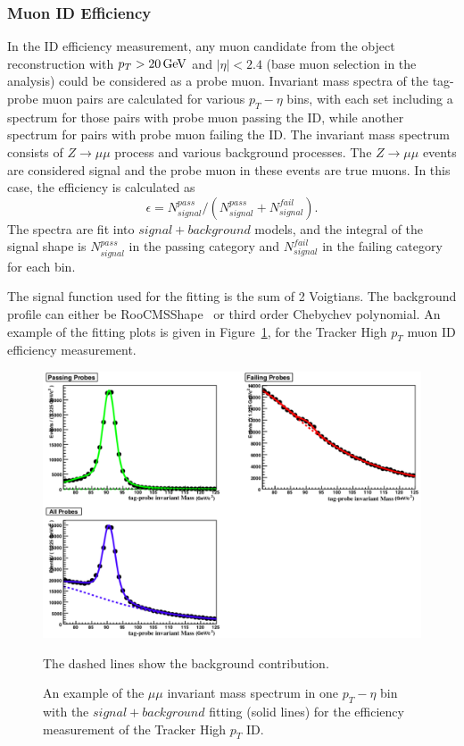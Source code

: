 \subsubsection{Muon ID Efficiency}
In the ID efficiency measurement, any muon candidate from the object reconstruction with $p_T > 20\,\text{Ge\hspace{-.08em}V}$ and $|\eta|<2.4$ (base muon selection in the analysis) could be considered as a probe muon. Invariant mass spectra of the tag-probe muon pairs are calculated for various $p_T - \eta$ bins, with each set including a spectrum for those pairs with probe muon passing the ID, while another spectrum for pairs with probe muon failing the ID. The invariant mass spectrum consists of $Z\rightarrow \mu\mu$ process and various background processes. The $Z\rightarrow \mu\mu$ events are considered signal and the probe muon in these events are true muons. In this case, the efficiency is calculated as
\begin{equation}
\epsilon=N_{signal}^{pass}/(N_{signal}^{pass}+N_{signal}^{fail}). 
\end{equation}
The spectra are fit into $signal+background$ models, and the integral of the signal shape is $N_{signal}^{pass}$ in the passing category and $N_{signal}^{fail}$ in the failing category for each bin. 

\vspace{0.3cm}
The signal function used for the fitting is the sum of 2 Voigtians. The background profile can either be RooCMSShape~\cite{bg_cmsshape} or third order Chebychev polynomial. An example of the fitting plots is given in Figure~\ref{fig:bg_tnpmuonid}, for the Tracker High $p_T$ muon ID efficiency measurement.
\begin{figure}[htbp]
\begin{center}
\includegraphics[width=0.9\linewidth]{figures/bg_tnpmuonid.png}
\caption{An example of the $\mu\mu$ invariant mass spectrum in one $p_T - \eta$ bin with the $signal+background$ fitting (solid lines) for the efficiency measurement of the Tracker High $p_T$ ID.} The dashed lines show the background contribution.
\label{fig:bg_tnpmuonid}
\end{center}
\end{figure}

